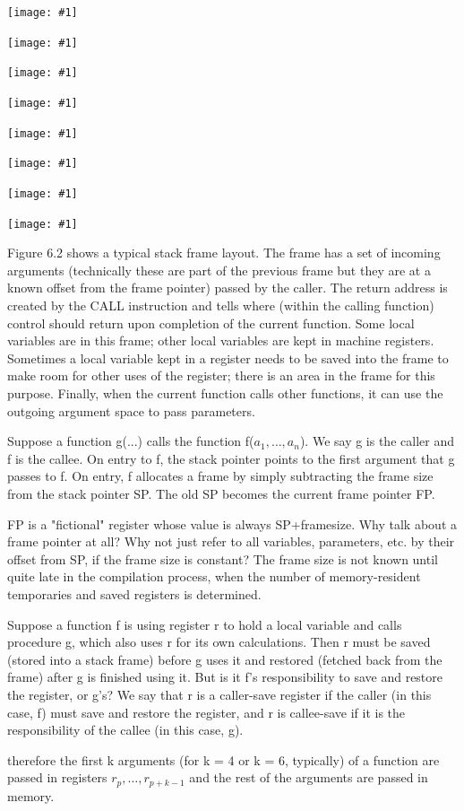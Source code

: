 \documentclass[8pt, a4paper, oneside, twocolumn]{extarticle}
\newcommand{\ph}[1]{
    \texttt{[image: \#1]}
}
\begin{document}
\ph{r1}

\ph{r2}

\ph{r3}

\ph{r4}

\ph{r5}

\ph{r6}

\ph{r7}

\ph{r8}

Figure 6.2 shows a typical stack frame layout. The frame has a set of 
incoming arguments (technically these are part of the previous frame but they
are at a known offset from the frame pointer) passed by the caller. The 
return address is created by the CALL instruction and tells where (within the
calling function) control should return upon completion of the current 
function. Some local variables are in this frame; other local variables are kept in
machine registers. Sometimes a local variable kept in a register needs to be
saved into the frame to make room for other uses of the register; there is an
area in the frame for this purpose. Finally, when the current function calls
other functions, it can use the outgoing argument space to pass parameters.

Suppose a function g(...) calls the function f($a_1, \dots , a_n$). We say g is the
caller and f is the callee.
On entry to f, the stack pointer points to the first
argument that g passes to f. On entry, f allocates a frame by simply 
subtracting the frame size from the stack pointer SP. The old SP becomes the current frame pointer FP.

FP is a
"fictional" register whose value is always SP+framesize.
Why talk about a frame pointer at all? Why not just refer to all variables,
parameters, etc. by their offset from SP, if the frame size is constant? The
frame size is not known until quite late in the compilation process, when the
number of memory-resident temporaries and saved registers is determined.

Suppose a function f is using register r to hold a local variable and calls procedure g, which also uses r for
its own calculations. Then r must be saved (stored into a stack frame) before
g uses it and restored (fetched back from the frame) after g is finished using
it. But is it f's responsibility to save and restore the register, or g's? We say
that r is a caller-save register if the caller (in this case, f) must save and 
restore the register, and r is callee-save if it is the responsibility of the callee
(in this case, g).

therefore the
first k arguments (for k = 4 or k = 6, typically) of a function are passed in
registers $r_p, \dots, r_{p+k - 1}$ and the rest of the arguments are passed in memory.
\end{document}
